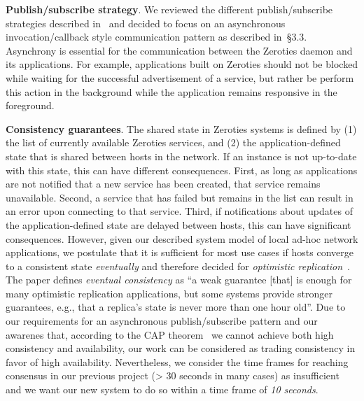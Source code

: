 \textbf{Publish/subscribe strategy}. 
We reviewed the different publish/subscribe strategies described in~\cite{eugster_2003} and decided to focus on an asynchronous invocation/callback style communication pattern as described in~\cite{eugster_2003}§3.3. 
Asynchrony is essential for the communication between the Zeroties daemon and its applications.
For example, applications built on Zeroties should not be blocked while waiting for the successful advertisement of a service, but rather be perform this action in the background while the application remains responsive in the foreground.

\textbf{Consistency guarantees}.
The shared state in Zeroties systems is defined by (1) the list of currently available Zeroties services, and (2) the application-defined state that is shared between hosts in the network.
If an instance is not up-to-date with this state, this can have different consequences. 
First, as long as applications are not notified that a new service has been created, that service remains unavailable.
Second, a service that has failed but remains in the list can result in an error upon connecting to that service. 
Third, if notifications about updates of the application-defined state are delayed between hosts, this can have significant consequences.
However, given our described system model of local ad-hoc network applications, we postulate that it is sufficient for most use cases if hosts converge to a consistent state \textit{eventually} and therefore decided for \textit{optimistic replication}~\cite{saito_2005}.
The paper defines \textit{eventual consistency} as ``a weak guarantee [that] is enough for many optimistic replication applications, but some systems provide stronger guarantees, e.g., that a replica's state is never more than one hour old''.
Due to our requirements for an asynchronous publish/subscribe pattern and our awarenes that, according to the CAP theorem~\cite{gilbert_2012} we cannot achieve both high consistency and availability, our work can be considered as trading consistency in favor of high availability.
Nevertheless, we consider the time frames for reaching consensus in our previous project (> 30 seconds in many cases) as insufficient and we want our new system to do so within a time frame of \textit{10 seconds}.


